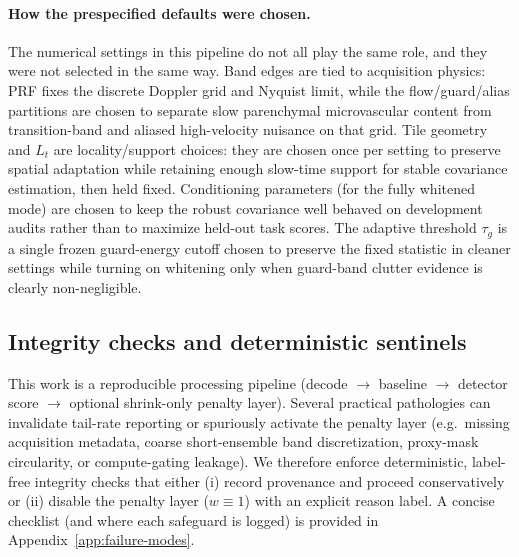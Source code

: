\documentclass[11pt]{article}
\newif\ifPAPERONLY
\newcommand{\SuppOrApp}[1]{\ifPAPERONLY Supplementary Material\else Appendix~\ref{#1}\fi}
\begin{document}
\paragraph{How the prespecified defaults were chosen.}
\ifPAPERONLY
Band edges are tied to acquisition physics, while tile geometry and $L_t$ are chosen once per setting to preserve spatial adaptation with stable detector estimates and then held fixed. The adaptive threshold $\tau_g$ is a single frozen guard-energy cutoff chosen to keep the fixed score in cleaner settings and enable whitening only when guard-band clutter evidence is clearly non-negligible.
\else
The numerical settings in this pipeline do not all play the same role, and they were not selected in the same way. Band edges are tied to acquisition physics: PRF fixes the discrete Doppler grid and Nyquist limit, while the flow/guard/alias partitions are chosen to separate slow parenchymal microvascular content from transition-band and aliased high-velocity nuisance on that grid. Tile geometry and $L_t$ are locality/support choices: they are chosen once per setting to preserve spatial adaptation while retaining enough slow-time support for stable covariance estimation, then held fixed. Conditioning parameters (for the fully whitened mode) are chosen to keep the robust covariance well behaved on development audits rather than to maximize held-out task scores. The adaptive threshold $\tau_g$ is a single frozen guard-energy cutoff chosen to preserve the fixed statistic in cleaner settings while turning on whitening only when guard-band clutter evidence is clearly non-negligible.
\fi

\ifPAPERONLY
\noindent Additional checks for acquisition metadata and compute gating are deterministic and are applied before reporting.
\else
\subsection{Integrity checks and deterministic sentinels}
This work is a reproducible processing pipeline (decode $\rightarrow$ baseline $\rightarrow$ detector score $\rightarrow$ optional shrink-only penalty layer). Several practical pathologies can invalidate tail-rate reporting or spuriously activate the penalty layer (e.g.\ missing acquisition metadata, coarse short-ensemble band discretization, proxy-mask circularity, or compute-gating leakage). We therefore enforce deterministic, label-free integrity checks that either (i) record provenance and proceed conservatively or (ii) disable the penalty layer ($w\equiv 1$) with an explicit reason label. A concise checklist (and where each safeguard is logged) is provided in \SuppOrApp{app:failure-modes}.
\fi
\end{document}

